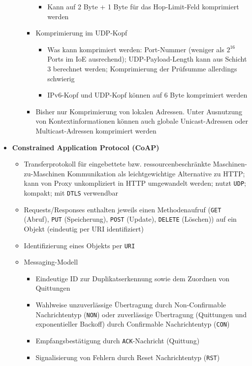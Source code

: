 \begin{itemize}
\begin{itemize}
\begin{itemize}
\begin{itemize}
				\item Kann auf 2 Byte + 1 Byte für das Hop-Limit-Feld komprimiert werden
			\end{itemize}
			\item Komprimierung im UDP-Kopf
			\begin{itemize}
				\item Was kann komprimiert werden: Port-Nummer (weniger als \(2^{16}\) Ports im IoE ausrechend); UDP-Payload-Length kann aus Schicht 3 berechnet werden; Komprimierung der Prüfsumme allerdings schwierig
				\item IPv6-Kopf und UDP-Kopf können auf 6 Byte komprimiert werden
			\end{itemize}
			\item Bisher nur Komprimierung von lokalen Adressen. Unter Ausnutzung von Kontextinformationen können auch globale Unicast-Adressen oder Multicast-Adressen komprimiert werden
		\end{itemize}
	\end{itemize}
	\item \textbf{Constrained Application Protocol (CoAP)}
	\begin{itemize}
		\item Transferprotokoll für eingebettete bzw. ressourcenbeschränkte Maschinen-zu-Maschinen Kommunikation als leichtgewichtige Alternative zu HTTP; kann von Proxy unkompliziert in HTTP umgewandelt werden; nutzt \texttt{UDP}; kompakt; mit \texttt{DTLS} verwendbar
		\item Requests/Responses enthalten jeweils einen Methodenaufruf (\texttt{GET} (Abruf), \texttt{PUT} (Speicherung), \texttt{POST} (Update), \texttt{DELETE} (Löschen)) auf ein Objekt (eindeutig per URI identifiziert)
		\item Identifizierung eines Objekts per \texttt{URI}
		\item Messaging-Modell
		\begin{itemize}
			\item Eindeutige ID zur Duplikatserkennung sowie dem Zuordnen von Quittungen
			\item Wahlweise unzuverlässige Übertragung durch Non-Confirmable Nachrichtentyp (\texttt{NON}) oder zuverlässige Übertragung (Quittungen und exponentieller Backoff) durch Confirmable Nachrichtentyp (\texttt{CON})
			\item Empfangsbestätigung durch \texttt{ACK}-Nachricht (Quittung)
			\item Signalisierung von Fehlern durch Reset Nachrichtentyp (\texttt{RST})
		\end{itemize}

\end{itemize}
\end{itemize}
